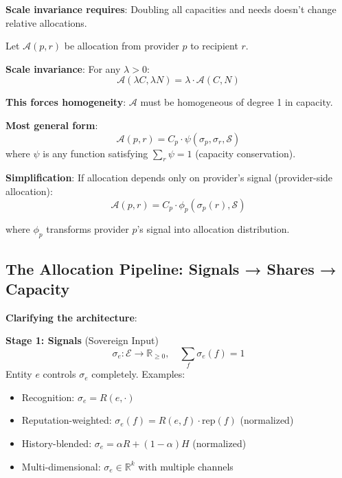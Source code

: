 \documentclass[11pt,a4paper]{article}
\theoremstyle{definition}
\theoremstyle{remark}
\newcommand{\E}{\mathcal{E}}
\begin{document}
\textbf{Scale invariance requires}: Doubling all capacities and needs doesn't change relative allocations.

Let $\mathcal{A}(p,r)$ be allocation from provider $p$ to recipient $r$.

\textbf{Scale invariance}: For any $\lambda > 0$:
\[ \mathcal{A}(\lambda C, \lambda N) = \lambda \cdot \mathcal{A}(C, N) \]

\textbf{This forces homogeneity}: $\mathcal{A}$ must be homogeneous of degree 1 in capacity.

\textbf{Most general form}:
\[ \mathcal{A}(p,r) = C_p \cdot \psi(\sigma_p, \sigma_r, \mathcal{S}) \]
where $\psi$ is any function satisfying $\sum_r \psi = 1$ (capacity conservation).

\textbf{Simplification}: If allocation depends only on provider's signal (provider-side allocation):
\[ \mathcal{A}(p,r) = C_p \cdot \phi_p(\sigma_p(r), \mathcal{S}) \]

where $\phi_p$ transforms provider $p$'s signal into allocation distribution.

\subsection{The Allocation Pipeline: Signals → Shares → Capacity}

\textbf{Clarifying the architecture}:

\begin{center}
\begin{tikzpicture}[node distance=2cm]
\end{tikzpicture}
\end{center}

\textbf{Stage 1: Signals} (Sovereign Input)
\[ \sigma_e: \E \rightarrow \mathbb{R}_{\ge 0}, \quad \sum_f \sigma_e(f) = 1 \]
Entity $e$ controls $\sigma_e$ completely. Examples:
\begin{itemize}
\item Recognition: $\sigma_e = R(e, \cdot)$
\item Reputation-weighted: $\sigma_e(f) = R(e,f) \cdot \text{rep}(f)$ (normalized)
\item History-blended: $\sigma_e = \alpha R + (1-\alpha) H$ (normalized)
\item Multi-dimensional: $\sigma_e \in \mathbb{R}^k$ with multiple channels
\end{itemize}
\end{document}
